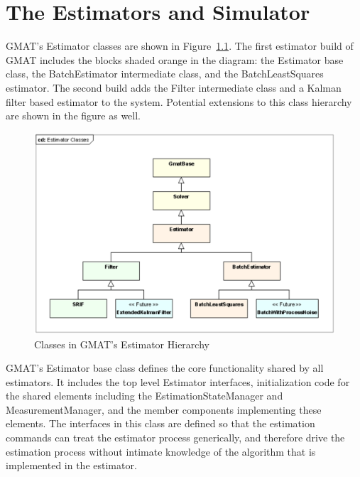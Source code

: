 \chapter{The Estimators and Simulator}


GMAT's Estimator classes are shown in Figure~\ref{fig:EstimatorClasses}.  The first estimator build of GMAT includes the blocks shaded orange in the diagram: the Estimator base class, the BatchEstimator intermediate class, and the BatchLeastSquares estimator.  The second build adds the Filter intermediate class and a Kalman filter based estimator to the system.  Potential extensions to this class hierarchy are shown in the figure as well.

\begin{figure}[htbp]
\begin{center}
\includegraphics[scale=0.6]{Images/EstimatorClasses.eps}
\caption{\label{fig:EstimatorClasses}Classes in GMAT's Estimator Hierarchy}
\end{center}
\end{figure}

GMAT's Estimator base class defines the core functionality shared by all estimators.  It includes the top level Estimator interfaces, initialization code for the shared elements including the EstimationStateManager and MeasurementManager, and the member components implementing these elements.  The interfaces in this class are defined so that the estimation commands can treat the estimator process generically, and therefore drive the estimation process without intimate knowledge of the algorithm that is implemented in the estimator.


